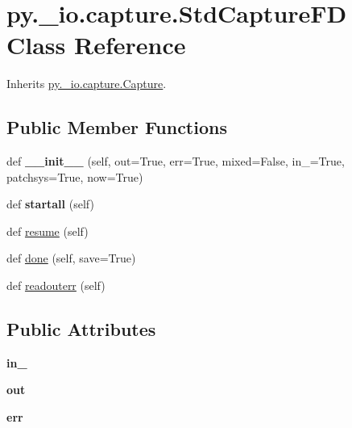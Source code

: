 \hypertarget{classpy_1_1__io_1_1capture_1_1_std_capture_f_d}{}\section{py.\+\_\+io.\+capture.\+Std\+Capture\+FD Class Reference}
\label{classpy_1_1__io_1_1capture_1_1_std_capture_f_d}


Inherits \hyperlink{classpy_1_1__io_1_1capture_1_1_capture}{py.\+\_\+io.\+capture.\+Capture}.

\subsection*{Public Member Functions}
\begin{DoxyCompactItemize}
\item 
\mbox{\label{classpy_1_1__io_1_1capture_1_1_std_capture_f_d_a83162503a1e17128e51ee357cc288dcd}} 
def {\bfseries \+\_\+\+\_\+init\+\_\+\+\_\+} (self, out=True, err=True, mixed=False, in\+\_\+=True, patchsys=True, now=True)
\item 
\mbox{\label{classpy_1_1__io_1_1capture_1_1_std_capture_f_d_a2810e4aa5b72adcde16b39aeba49fc0b}} 
def {\bfseries startall} (self)
\item 
def \hyperlink{classpy_1_1__io_1_1capture_1_1_std_capture_f_d_a7ad7f22f005425709dec0a189dbe471e}{resume} (self)
\item 
def \hyperlink{classpy_1_1__io_1_1capture_1_1_std_capture_f_d_aa6d30151b553acf2388dde62347424b8}{done} (self, save=True)
\item 
def \hyperlink{classpy_1_1__io_1_1capture_1_1_std_capture_f_d_adbd69a690c67424fd006f48ed7b672cd}{readouterr} (self)
\end{DoxyCompactItemize}
\subsection*{Public Attributes}
\begin{DoxyCompactItemize}
\item 
\mbox{\label{classpy_1_1__io_1_1capture_1_1_std_capture_f_d_ad99115c9f0de6840952cc7df96df35fe}} 
{\bfseries in\+\_\+}
\item 
\mbox{\label{classpy_1_1__io_1_1capture_1_1_std_capture_f_d_aae68d0d734ae5da8cf27bfb2b64c1548}} 
{\bfseries out}
\item 
\mbox{\label{classpy_1_1__io_1_1capture_1_1_std_capture_f_d_a9072a4ca2da9e8e64c39e45fdb31cff6}} 
{\bfseries err}
\end{DoxyCompactItemize}
